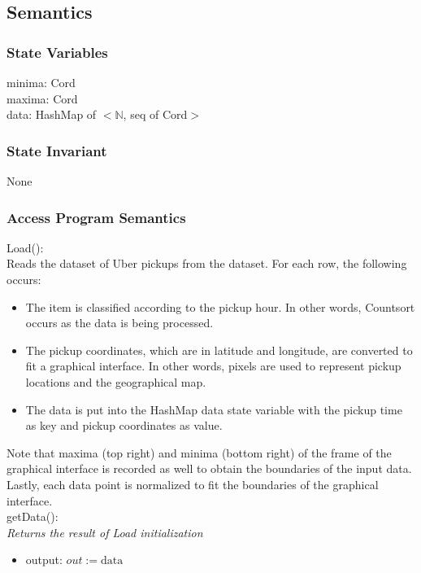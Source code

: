 \documentclass[12pt]{article}
\begin{document}
\subsection* {Semantics}

\subsubsection* {State Variables}

minima: Cord\\
maxima: Cord\\
data: HashMap of $<\mathbb{N}$, seq of Cord$>$

\subsubsection* {State Invariant}

None

\subsubsection* {Access Program Semantics}

Load():\\
\noindent
Reads the dataset of Uber pickups from the dataset. For each row, the following occurs:
\begin{itemize}
\item The item is classified according to the pickup hour. In other words, Countsort occurs
as the data is being processed.
\item The pickup coordinates, which are in latitude and longitude, are converted to fit
a graphical interface. In other words, pixels are used to represent pickup locations
and the geographical map.
\item The data is put into the HashMap data state variable with the pickup time as key and 
pickup coordinates as value.
\end{itemize}
Note that maxima (top right) and minima (bottom right) of the frame of the graphical
interface is recorded as well to obtain the boundaries of the input data.\\
\noindent
Lastly, each data point is normalized to fit the boundaries of the graphical interface.\\

\noindent
getData():\\
\textit{Returns the result of Load initialization}
\begin{itemize}
\item output: $out := \mbox{data}$
\end{itemize}
\end{document}
